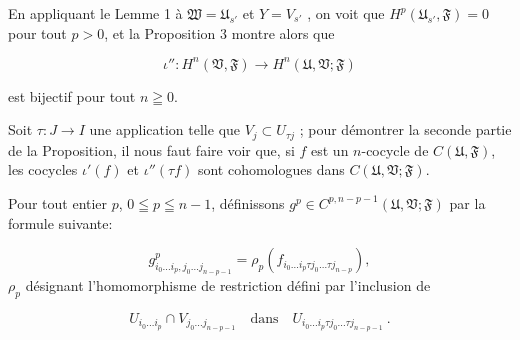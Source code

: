 En appliquant le Lemme 1 à $\mathfrak{W} = \mathfrak{U}_{s'}$ et $Y = V_{s'}$ , on voit que $H^p(\mathfrak{U}_{s'} , \mathfrak{F}) = 0$ pour tout $p > 0$, et la Proposition 3 montre alors que

\begin{equation*}
\iota'' : H^n(\mathfrak{V}, \mathfrak{F}) \longrightarrow H^n(\mathfrak{U}, \mathfrak{V}; \mathfrak{F})
\end{equation*}

est bijectif pour tout $n \geqq 0$.

Soit $\tau: J \rightarrow I$ une application telle que $V_j \subset U_{\tau j}$ ; pour démontrer la seconde partie de la Proposition, il nous faut faire voir que, si $f$ est un $n$-cocycle de $C(\mathfrak{U}, \mathfrak{F})$, les cocycles $\iota'(f)$ et $\iota''(\tau f)$ sont cohomologues dans $C(\mathfrak{U}, \mathfrak{V}; \mathfrak{F})$.



%
%
%
%
Pour tout entier $p$, $0 \leqq p \leqq n - 1$, définissons $g^p \in C^{p, n-p-1}(\mathfrak{U}, \mathfrak{V}; \mathfrak{F})$ par la formule suivante:

\begin{equation*}
g^p_{i_0 \ldots i_p , j_0 \ldots j_{n-p-1}} = \rho_p(f_{i_0 \ldots i_p \tau j_0 \ldots \tau j_{n-p}}),
\end{equation*}
$\rho_p$ désignant l'homomorphisme de restriction défini par l'inclusion de

\begin{equation*}
U_{i_0 \ldots i_p} \cap V_{j_0 \ldots j_{n-p-1}} \quad \text{dans} \quad U_{i_0 \ldots i_p \tau j_0 \ldots \tau j_{n-p-1}} \ .
\end{equation*}


